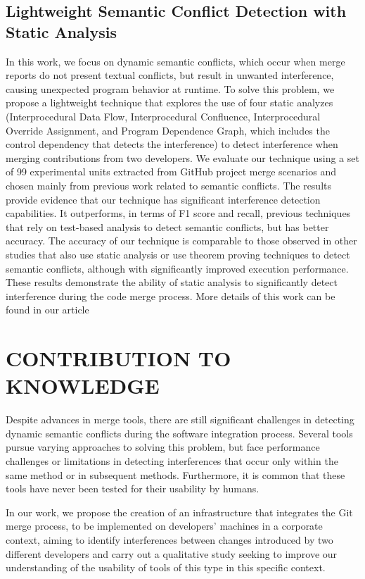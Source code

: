 \documentclass[sigconf,review]{acmart}
\begin{document}
\subsection{Lightweight Semantic Conflict Detection with Static Analysis}
In this work, we focus on dynamic semantic conflicts, which occur when merge reports do not present textual conflicts, but result in unwanted interference, causing unexpected program behavior at runtime.
To solve this problem, we propose a lightweight technique that explores the use of four static analyzes (Interprocedural Data Flow, Interprocedural
Confluence, Interprocedural Override Assignment, and Program Dependence Graph, which includes the control
dependency that detects the interference) to detect interference when merging contributions from two developers.
We evaluate our technique using a set of 99 experimental units extracted from GitHub project merge scenarios and chosen mainly from previous work related to semantic conflicts.
The results provide evidence that our technique has significant interference detection capabilities. It outperforms, in terms of F1 score and recall, previous techniques that rely on test-based analysis to detect semantic conflicts, but has better accuracy.
The accuracy of our technique is comparable to those observed in other studies that also use static analysis or use theorem proving techniques to detect semantic conflicts, although with significantly improved execution performance. These results demonstrate the ability of static analysis to significantly detect interference during the code merge process. More details of this work can be found in our article \cite{galileu}

\section{CONTRIBUTION TO KNOWLEDGE}

Despite advances in merge tools, there are still significant challenges in detecting dynamic semantic conflicts during the software integration process. Several tools pursue varying approaches to solving this problem, but face performance challenges or limitations in detecting interferences that occur only within the same method or in subsequent methods. Furthermore, it is common that these tools have never been tested for their usability by humans.

In our work, we propose the creation of an infrastructure that integrates the Git merge process, to be implemented on developers' machines in a corporate context, aiming to identify interferences between changes introduced by two different developers and carry out a qualitative study seeking to improve our understanding of the usability of tools of this type in this specific context.
\end{document}
